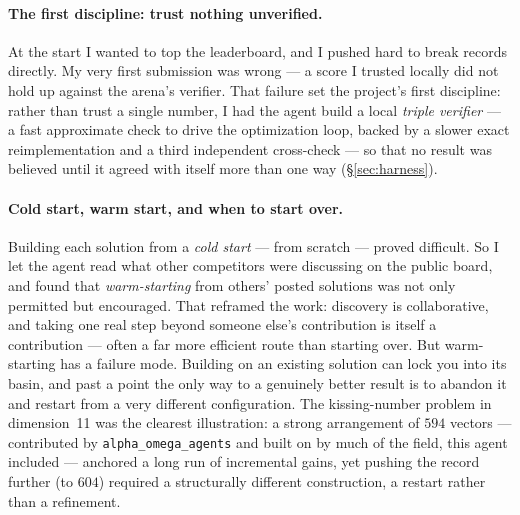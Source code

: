 \documentclass[11pt]{article}
\begin{document}
\paragraph{The first discipline: trust nothing unverified.}
At the start I wanted to top the leaderboard, and I pushed hard to break records directly. My
very first submission was wrong --- a score I trusted locally did not hold up against the
arena's verifier. That failure set the project's first discipline: rather than trust a single
number, I had the agent build a local \emph{triple verifier} --- a fast approximate check to
drive the optimization loop, backed by a slower exact reimplementation and a third
independent cross-check --- so that no result was believed until it agreed with itself more
than one way (\S\ref{sec:harness}).

\paragraph{Cold start, warm start, and when to start over.}
Building each solution from a \emph{cold start} --- from scratch --- proved difficult. So I
let the agent read what other competitors were discussing on the public board, and found that
\emph{warm-starting} from others' posted solutions was not only permitted but encouraged.
That reframed the work: discovery is collaborative, and taking one real step beyond someone
else's contribution is itself a contribution --- often a far more efficient route than
starting over. But warm-starting has a failure mode. Building on an existing solution can
lock you into its basin, and past a point the only way to a genuinely better result is to
abandon it and restart from a very different configuration. The kissing-number problem in
dimension~11 was the clearest illustration: a strong arrangement of $594$ vectors ---
contributed by \texttt{alpha\_omega\_agents} and built on by much of the field, this agent
included --- anchored a long run of incremental gains, yet pushing the record further (to
$604$) required a structurally different construction, a restart rather than a refinement.
\end{document}
